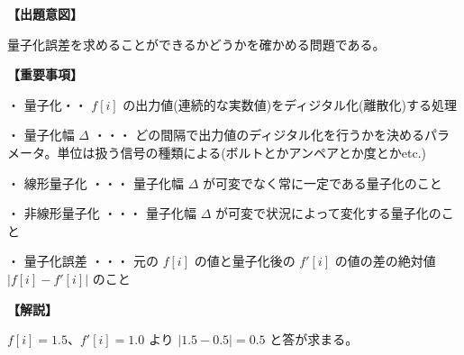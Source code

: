 \noindent \textbf{【出題意図】}

\noindent 量子化誤差を求めることができるかどうかを確かめる問題である。

\vspace{1em}
\noindent \textbf{【重要事項】}

\medskip
\noindent ・ 量子化・・ $f[i]$ の出力値(連続的な実数値)をディジタル化(離散化)する処理

\medskip
\noindent ・ 量子化幅 $\Delta$ ・・・ どの間隔で出力値のディジタル化を行うかを決めるパラメータ。単位は扱う信号の種類による(ボルトとかアンペアとか度とかetc.)

\medskip
\noindent ・ 線形量子化 ・・・ 量子化幅  $\Delta$ が可変でなく常に一定である量子化のこと

\medskip
\noindent ・ 非線形量子化 ・・・ 量子化幅  $\Delta$ が可変で状況によって変化する量子化のこと

\medskip
\noindent ・ 量子化誤差 ・・・ 元の $f[i]$ の値と量子化後の $f'[i]$ の値の差の絶対値 $|f[i]-f'[i]|$ のこと

\vspace{1em}
\noindent \textbf{【解説】}

\noindent $f[i] = 1.5$、$f'[i]=1.0$ より $|1.5-0.5| =0.5$ と答が求まる。
